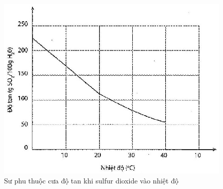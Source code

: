 \documentclass[10pt]{article}
\begin{document}
\begin{figure}[h]
\begin{center}
  \includegraphics[width=\textwidth]{2025_10_23_fa9073eecee116ad8cf2g-25}
\captionsetup{labelformat=empty}
\caption{Sư phu thuộc cưa độ tan khi sulfur dioxide vào nhiệt độ}
\end{center}
\end{figure}
\end{document}
